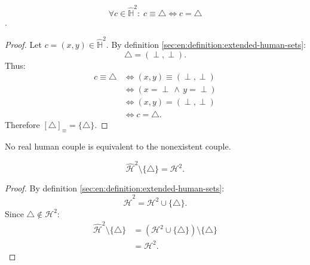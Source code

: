 \begin{proposition}
    \begin{statement}
        $$\forall c\in\hat{\mathbb{H}}^2:\;c\equiv\triangle\Longleftrightarrow c=\triangle$$.
    \end{statement}
    \begin{proof}
        Let $c=(x,y)\in\hat{\mathbb{H}}^2$. By definition \ref{sec:en:definition:extended-human-sets}:
        $$\triangle=(\perp,\perp).$$
        Thus:
        \begin{align*}
            c\equiv\triangle &\Longleftrightarrow (x,y) \equiv (\perp,\perp) \\
            &\Longleftrightarrow (x=\perp\,\land\,y=\perp) \\
            &\Longleftrightarrow (x,y) = (\perp,\perp) \\
            &\Longleftrightarrow c = \triangle.
        \end{align*}
        Therefore $[\triangle]_\equiv=\{\triangle\}$.
    \end{proof}
\end{proposition}

\begin{corollary}
    No real human couple is equivalent to the nonexistent couple.
\end{corollary}

\begin{proposition}
    \begin{statement}
        $$\hat{\mathcal{H}}^2\setminus\{\triangle\}=\mathcal{H}^2.$$
    \end{statement}
    \begin{proof}
        By definition \ref{sec:en:definition:extended-human-sets}:
        $$\hat{\mathcal{H}}^2=\mathcal{H}^2\cup\{\triangle\}.$$
        Since $\triangle\notin\mathcal{H}^2$:
        \begin{align*}
            \hat{\mathcal{H}}^2\setminus\{\triangle\} &= (\mathcal{H}^2\cup\{\triangle\})\setminus\{\triangle\} \\
            &= \mathcal{H}^2.
        \end{align*}
    \end{proof}
\end{proposition}

